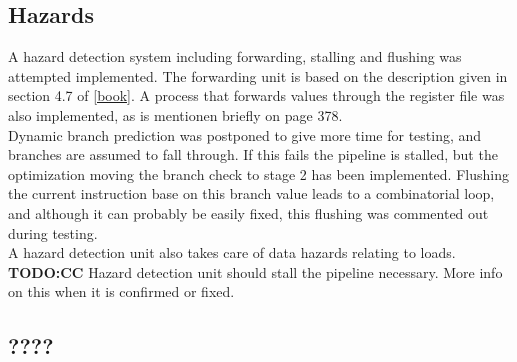 \subsection{Hazards}
A hazard detection system including forwarding, stalling and flushing was attempted implemented. The forwarding unit is based on the description given in section 4.7 of \ref{book}. A process that forwards values through the register file was also implemented, as is mentionen briefly on page  378.\\
Dynamic branch prediction was postponed to give more time for testing, and branches are assumed to fall through. If this fails the pipeline is stalled, but the optimization moving the branch check to stage 2 has been implemented. Flushing the current instruction base on this branch value leads to a combinatorial loop, and although it can probably be easily fixed, this flushing was commented out during testing.\\
A hazard detection unit also takes care of data hazards relating to loads. \textbf{TODO:CC}
Hazard detection unit should stall the pipeline necessary. More info on this when it is confirmed or fixed.

\subsection{????}